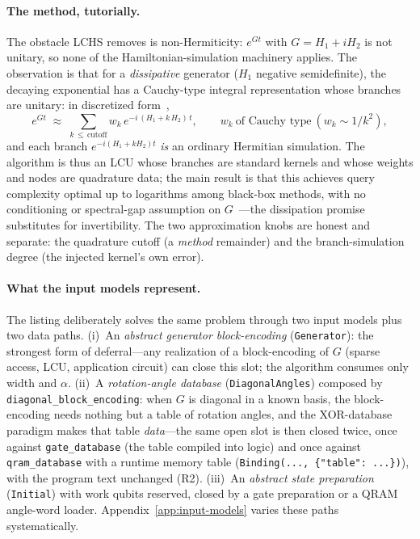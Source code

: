 \paragraph{The method, tutorially.}
The obstacle LCHS removes is non-Hermiticity: $e^{Gt}$ with
$G=H_1+iH_2$ is not unitary, so none of the Hamiltonian-simulation
machinery applies.  The observation is that for a \emph{dissipative}
generator ($H_1$ negative semidefinite), the decaying exponential has a
Cauchy-type integral representation whose branches are unitary: in
discretized form~\cite{an2026lchs},
\[
e^{Gt} \;\approx\; \sum_{k \,\le\, \text{cutoff}} w_k \,
e^{-i\,(H_1 + k\,H_2)\,t},
\qquad
w_k \ \text{of Cauchy type} \ (w_k \sim 1/k^2) ,
\]
and each branch $e^{-i(H_1+kH_2)t}$ \emph{is} an ordinary Hermitian
simulation.  The algorithm is thus an LCU whose branches are standard
kernels and whose weights and nodes are quadrature data; the main result
is that this achieves query complexity optimal up to logarithms among
black-box methods, with no conditioning or spectral-gap assumption on
$G$~\cite{an2026lchs}---the dissipation promise substitutes for
invertibility.  The two approximation knobs are honest and separate:
the quadrature cutoff (a \emph{method} remainder) and the branch-simulation
degree (the injected kernel's own error).

\paragraph{What the input models represent.}
The listing deliberately solves the same problem through two input models
plus two data paths.  (i)~An \emph{abstract generator block-encoding}
(\texttt{Generator}): the strongest form of deferral---any realization of
a block-encoding of $G$ (sparse access, LCU, application circuit) can
close this slot; the algorithm consumes only width and $\alpha$.  (ii)~A
\emph{rotation-angle database} (\texttt{DiagonalAngles}) composed by
\texttt{diagonal\_block\_encoding}: when $G$ is diagonal in a known basis,
the block-encoding needs nothing but a table of rotation angles, and the
XOR-database paradigm makes that table \emph{data}---the same open slot
is then closed twice, once against \texttt{gate\_database} (the table
compiled into logic) and once against \texttt{qram\_database} with a
runtime memory table (\texttt{Binding(..., \{"table": ...\})}), with the
program text unchanged (R2).  (iii)~An \emph{abstract state preparation}
(\texttt{Initial}) with work qubits reserved, closed by a gate
preparation or a QRAM angle-word loader.  Appendix~\ref{app:input-models}
varies these paths systematically.

